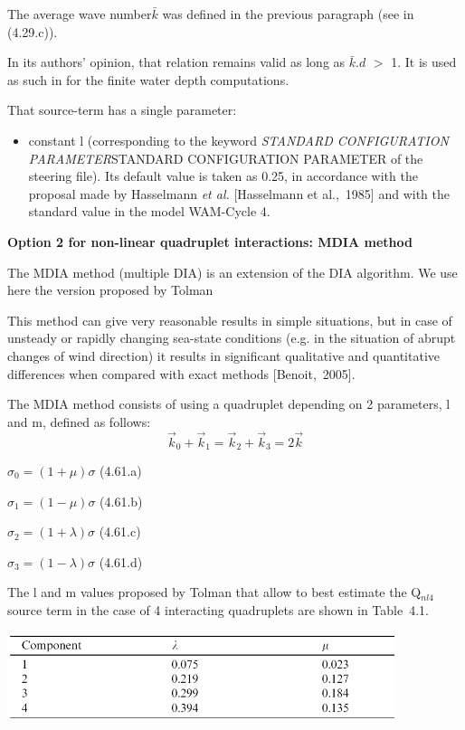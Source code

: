  The average wave number$\bar{k}$ was defined in the previous paragraph (see in (4.29.c)).

 In its authors' opinion, that relation remains valid as long as $\bar{k}.d$ $>$ 1. It is used as such in \tomawac for the finite water depth computations.

 That source-term has a single parameter:

\begin{itemize}
\item  constant l (corresponding to the keyword \textit{STANDARD CONFIGURATION PARAMETER}STANDARD CONFIGURATION PARAMETER\textit{ }of the steering file). Its default value is taken as 0.25, in accordance with the proposal made by Hasselmann \textit{et al.} [Hasselmann et al.,~1985] and with the standard value in the model WAM-Cycle 4.
\end{itemize}


{\bf  Option 2 for non-linear quadruplet interactions: MDIA method}

 The MDIA method (multiple DIA) is an extension of the DIA algorithm. We use here the version proposed by Tolman \cite{Tolman2004}

 This method can give very reasonable results in simple situations, but in case of unsteady or rapidly changing sea-state conditions (e.g. in the situation of abrupt changes of wind direction) it results in significant qualitative and quantitative differences when compared with exact methods [Benoit,~2005].

 The MDIA method consists of using a quadruplet depending on 2 parameters, l and m, defined as follows:
\begin{equation} \label{GrindEQ__4_60_}
\vec{k}_{0} +\vec{k}_{1} =\vec{k}_{2} +\vec{k}_{3} =2\vec{k}
\end{equation}

$\sigma _{0} =(1+\mu )\sigma $ (4.61.a)

$\sigma _{1} =(1-\mu )\sigma $ (4.61.b)

$\sigma _{2} =(1+\lambda )\sigma $ (4.61.c)

$\sigma _{3} =(1-\lambda )\sigma $ (4.61.d)

 The l and m values proposed by Tolman that allow to best estimate the Q${}_{nl4}$ source term in the case of 4 interacting quadruplets are shown in Table~4.1.

 \includegraphics*[width=4.46in, height=1.06in, keepaspectratio=false, trim=0.00in 0.00in 0.14in 0.00in]{graphics/tabtolman}


